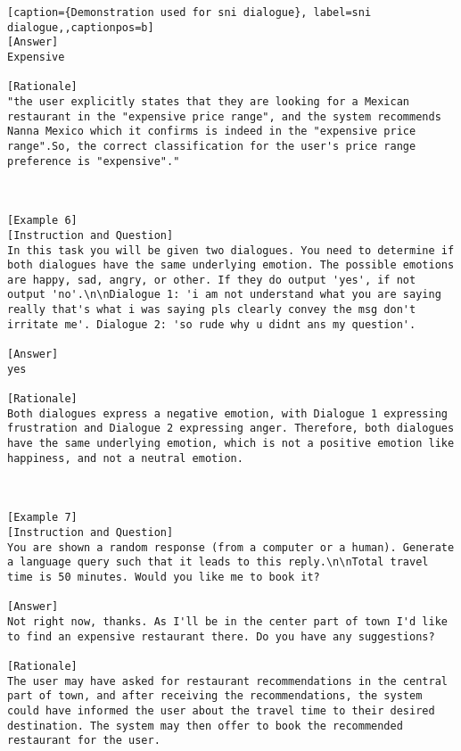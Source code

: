 \begin{lstlisting}[caption={Demonstration used for sni dialogue}, label=sni dialogue,,captionpos=b]
[Answer]
Expensive

[Rationale]
"the user explicitly states that they are looking for a Mexican restaurant in the "expensive price range", and the system recommends Nanna Mexico which it confirms is indeed in the "expensive price range".So, the correct classification for the user's price range preference is "expensive"."



[Example 6]
[Instruction and Question]
In this task you will be given two dialogues. You need to determine if both dialogues have the same underlying emotion. The possible emotions are happy, sad, angry, or other. If they do output 'yes', if not output 'no'.\n\nDialogue 1: 'i am not understand what you are saying  really that's what i was saying pls clearly convey the msg don't irritate me'. Dialogue 2: 'so rude why u didnt ans my question'.

[Answer]
yes

[Rationale]
Both dialogues express a negative emotion, with Dialogue 1 expressing frustration and Dialogue 2 expressing anger. Therefore, both dialogues have the same underlying emotion, which is not a positive emotion like happiness, and not a neutral emotion.



[Example 7]
[Instruction and Question]
You are shown a random response (from a computer or a human). Generate a language query such that it leads to this reply.\n\nTotal travel time is 50 minutes. Would you like me to book it?

[Answer]
Not right now, thanks. As I'll be in the center part of town I'd like to find an expensive restaurant there. Do you have any suggestions?

[Rationale]
The user may have asked for restaurant recommendations in the central part of town, and after receiving the recommendations, the system could have informed the user about the travel time to their desired destination. The system may then offer to book the recommended restaurant for the user.





\end{lstlisting}
